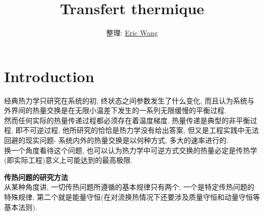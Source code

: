 \documentclass{article}
\begin{document}
\title{Transfert thermique}
\author{整理: \href{mailto:wangchaogo1990@gmail.com}{Eric Wang}}
\maketitle
\tableofcontents
\newpage
\section{Introduction}
经典热力学只研究在系统的初, 终状态之间参数发生了什么变化, 而且认为系统与外界间的热量交换是在无限小温差下发生的一系列无限缓慢的平衡过程.\\
然而任何实际的热量传递过程都必须存在着温度梯度. 热量传递是典型的非平衡过程, 即不可逆过程, 他所研究的恰恰是热力学没有给出答案, 但又是工程实践中无法回避的现实问题-
系统内外的热量交换是以何种方式, 多大的速率进行的.\\
换一个角度看待这个问题, 也可以认为热力学中可逆方式交换的热量必定是传热学(即实际工程)意义上可能达到的最高极限.

\bigskip
\textbf{传热问题的研究方法}\\
从某种角度讲, 一切传热问题所遵循的基本规律只有两个, 一个是特定传热问题的特殊规律, 第二个就是能量守恒(在对流换热情况下还要涉及质量守恒和动量守恒等基本法则).
\end{document}
